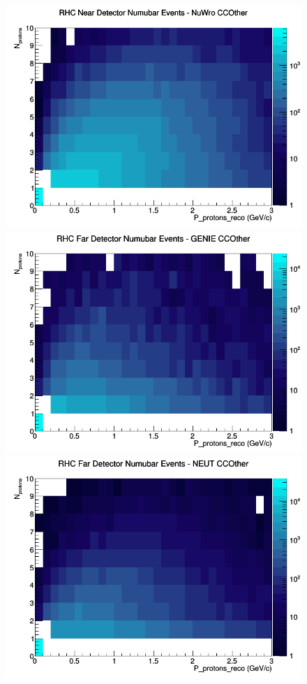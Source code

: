 \begin{figure}[h]
\includegraphics[width=\linewidth]{eff_N_P/LAr/protons/CCOther_RHC_ND_numubar_N_P_NuWro.png}
\endminipage
\newline
{}
\includegraphics[width=\linewidth]{eff_N_P/LAr/protons/CCOther_RHC_FD_numubar_N_P_GENIE.png}
\endminipage
{}
\includegraphics[width=\linewidth]{eff_N_P/LAr/protons/CCOther_RHC_FD_numubar_N_P_NEUT.png}

\end{figure}

